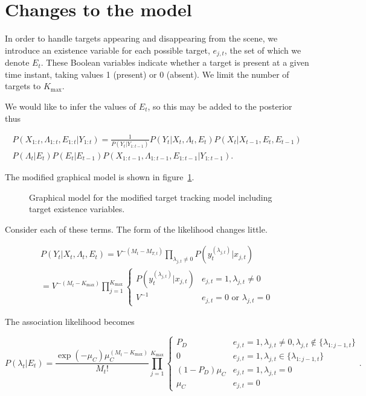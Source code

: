 \section{Changes to the model}
In order to handle targets appearing and disappearing from the scene, we introduce an existence variable for each possible target, $e_{j,t}$, the set of which we denote $E_t$. These Boolean variables indicate whether a target is present at a given time instant, taking values 1 (present) or 0 (absent). We limit the number of targets to $K_{\max}$.

We would like to infer the values of $E_t$, so this may be added to the posterior thus

\begin{multline}
P(X_{1:t}, \Lambda_{1:t}, E_{1:t}|Y_{1:t}) = \frac{1}{P(Y_t|Y_{1:t-1})} P(Y_t|X_t, \Lambda_t, E_t) P(X_t|X_{t-1}, E_t, E_{t-1}) \\ P(\Lambda_t|E_t) P(E_t|E_{t-1}) P(X_{1:t-1}, \Lambda_{1:t-1}, E_{1:t-1}|Y_{1:t-1}).
\label{eq:MTPosteriorWithE}
\end{multline}

The modified graphical model is shown in figure~\ref{fig:HMMExist}.

\begin{figure}[hbt]%

\caption{Graphical model for the modified target tracking model including target existence variables.}%
\label{fig:HMMExist}%
\end{figure}

Consider each of these terms. The form of the likelihood changes little.

\begin{multline}
P(Y_t|X_t, \Lambda_t, E_t) = V^{-(M_t-M_{T,t})} \prod_{\lambda_{j,t} \ne 0} P(y_t^{(\lambda_{j,t})}|x_{j,t}) \\
= V^{-(M_t-K_{\max})} \prod_{j=1}^{K_{\max}} \begin{cases} P(y_t^{(\lambda_{j,t})}|x_{j,t}) & e_{j,t} = 1, \lambda_{j,t} \ne 0 \\ V^{-1} & e_{j,t} = 0 \text{ or } \lambda_{j,t} = 0 \end{cases}
\label{eq:MTLikelihoodWithE}
\end{multline}

The association likelihood becomes

\begin{equation}
P(\lambda_t|E_t) = \frac{\exp(-\mu_C) \mu_C^{(M_t-K_{\max})}}{M_t!} \prod_{j=1}^{K_{\max}} \begin{cases} P_D & e_{j,t} = 1, \lambda_{j,t} \ne 0, \lambda_{j,t} \notin \{ \lambda_{1:j-1,t} \} \\ 0 & e_{j,t} = 1, \lambda_{j,t} \in \{ \lambda_{1:j-1,t} \} \\ (1-P_D) \mu_C & e_{j,t} = 1, \lambda_{j,t}=0 \\ \mu_C & e_{j,t} = 0 \end{cases}.
\label{eq:MTFactorisedAssociationLikelihoodWithE}
\end{equation}

